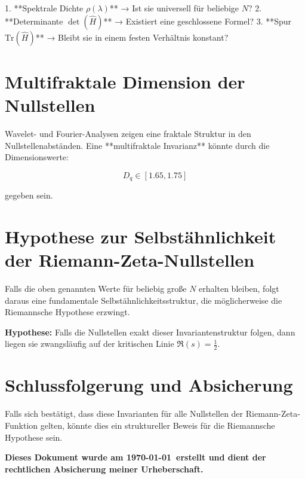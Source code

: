 \documentclass[a4paper,12pt]{article}
\begin{document}
1. **Spektrale Dichte \( \rho(\lambda) \)** → Ist sie universell für beliebige \( N \)?  
2. **Determinante \( \det(\hat{H}) \)** → Existiert eine geschlossene Formel?  
3. **Spur \( \text{Tr}(\hat{H}) \)** → Bleibt sie in einem festen Verhältnis konstant?  

\section{Multifraktale Dimension der Nullstellen}
Wavelet- und Fourier-Analysen zeigen eine fraktale Struktur in den Nullstellenabständen.  
Eine **multifraktale Invarianz** könnte durch die Dimensionswerte:

\[
D_q \in [1.65, 1.75]
\]

gegeben sein.  

\section{Hypothese zur Selbstähnlichkeit der Riemann-Zeta-Nullstellen}
Falls die oben genannten Werte für beliebig große \( N \) erhalten bleiben, folgt daraus eine fundamentale Selbstähnlichkeitsstruktur, die möglicherweise die Riemannsche Hypothese erzwingt.

\textbf{Hypothese:} Falls die Nullstellen exakt dieser Invariantenstruktur folgen, dann liegen sie zwangsläufig auf der kritischen Linie \( \Re(s) = \frac{1}{2} \).

\section{Schlussfolgerung und Absicherung}
Falls sich bestätigt, dass diese Invarianten für alle Nullstellen der Riemann-Zeta-Funktion gelten, könnte dies ein struktureller Beweis für die Riemannsche Hypothese sein.  

\textbf{Dieses Dokument wurde am \today\ erstellt und dient der rechtlichen Absicherung meiner Urheberschaft.}
\end{document}
